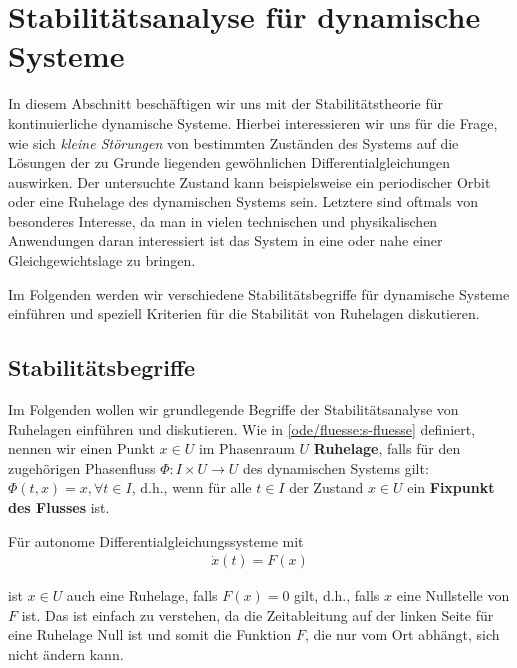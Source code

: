 \documentclass[letterpaper,10pt,english]{jupyterBook}
\begin{document}
\chapter{Stabilitätsanalyse für dynamische Systeme}
\label{\detokenize{odestability/stabilitaetsanalyse:stabilitatsanalyse-fur-dynamische-systeme}}\label{\detokenize{odestability/stabilitaetsanalyse::doc}}
\par
In diesem Abschnitt beschäftigen wir uns mit der Stabilitätstheorie für kontinuierliche dynamische Systeme.
Hierbei interessieren wir uns für die Frage, wie sich \emph{kleine Störungen} von bestimmten Zuständen des Systems auf die Lösungen der zu Grunde liegenden gewöhnlichen Differentialgleichungen auswirken.
Der untersuchte Zustand kann beispielsweise ein periodischer Orbit oder eine Ruhelage des dynamischen Systems sein.
Letztere sind oftmals von besonderes Interesse, da man in vielen technischen und physikalischen Anwendungen daran interessiert ist das System in eine oder nahe einer Gleichgewichtslage zu bringen.

\par
Im Folgenden werden wir verschiedene Stabilitätsbegriffe für dynamische Systeme einführen und speziell Kriterien für die Stabilität von Ruhelagen diskutieren.


\section{Stabilitätsbegriffe}
\label{\detokenize{odestability/stabilitaetsbegriffe:stabilitatsbegriffe}}\label{\detokenize{odestability/stabilitaetsbegriffe::doc}}
\par
Im Folgenden wollen wir grundlegende Begriffe der Stabilitätsanalyse von Ruhelagen einführen und diskutieren.
Wie in \cref{ode/fluesse:s-fluesse}  definiert, nennen wir einen Punkt \(x\in U\) im Phasenraum \(U\) \textbf{Ruhelage}, falls für den zugehörigen Phasenfluss \(\Phi \colon I \times U \rightarrow U\) des dynamischen Systems gilt: \(\Phi(t,x) = x, \forall t \in I\), d.h., wenn für alle \(t \in I\) der Zustand \(x \in U\) ein \textbf{Fixpunkt des Flusses} ist.

\par
Für autonome Differentialgleichungssysteme mit
\begin{align*}
\dot{x}(t) = F(x)
\end{align*}
\par
ist \(x \in U\) auch eine Ruhelage, falls \(F(x) = 0\) gilt, d.h., falls \(x\) eine Nullstelle von \(F\) ist.
Das ist einfach zu verstehen, da die Zeitableitung auf der linken Seite für eine Ruhelage Null ist und somit die Funktion \(F\), die nur vom Ort abhängt, sich nicht ändern kann.
\end{document}
